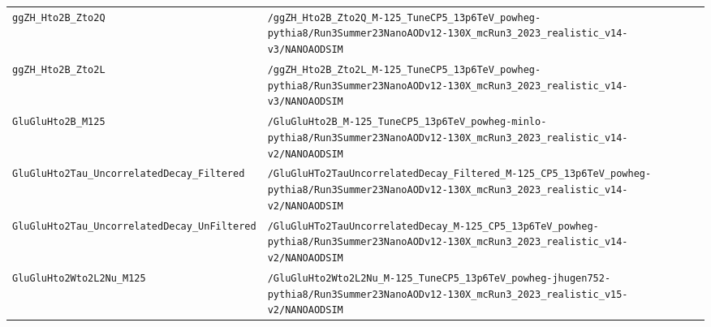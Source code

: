 \begin{longtable}{@{}>{\RaggedRight\arraybackslash}p{} >{\RaggedRight\arraybackslash}p{}@{}}
\texttt{ggZH\_\allowbreak{}Hto2B\_\allowbreak{}Zto2Q} & \texttt{/\allowbreak{}ggZH\_\allowbreak{}Hto2B\_\allowbreak{}Zto2Q\_\allowbreak{}M-\allowbreak{}125\_\allowbreak{}TuneCP5\_\allowbreak{}13p6TeV\_\allowbreak{}powheg-\allowbreak{}pythia8/\allowbreak{}Run3Summer23NanoAODv12-\allowbreak{}130X\_\allowbreak{}mcRun3\_\allowbreak{}2023\_\allowbreak{}realistic\_\allowbreak{}v14-\allowbreak{}v3/\allowbreak{}NANOAODSIM} \\
\addlinespace[2pt]
\texttt{ggZH\_\allowbreak{}Hto2B\_\allowbreak{}Zto2L} & \texttt{/\allowbreak{}ggZH\_\allowbreak{}Hto2B\_\allowbreak{}Zto2L\_\allowbreak{}M-\allowbreak{}125\_\allowbreak{}TuneCP5\_\allowbreak{}13p6TeV\_\allowbreak{}powheg-\allowbreak{}pythia8/\allowbreak{}Run3Summer23NanoAODv12-\allowbreak{}130X\_\allowbreak{}mcRun3\_\allowbreak{}2023\_\allowbreak{}realistic\_\allowbreak{}v14-\allowbreak{}v3/\allowbreak{}NANOAODSIM} \\
\addlinespace[2pt]
\texttt{GluGluHto2B\_\allowbreak{}M125} & \texttt{/\allowbreak{}GluGluHto2B\_\allowbreak{}M-\allowbreak{}125\_\allowbreak{}TuneCP5\_\allowbreak{}13p6TeV\_\allowbreak{}powheg-\allowbreak{}minlo-\allowbreak{}pythia8/\allowbreak{}Run3Summer23NanoAODv12-\allowbreak{}130X\_\allowbreak{}mcRun3\_\allowbreak{}2023\_\allowbreak{}realistic\_\allowbreak{}v14-\allowbreak{}v2/\allowbreak{}NANOAODSIM} \\
\addlinespace[2pt]
\texttt{GluGluHto2Tau\_\allowbreak{}UncorrelatedDecay\_\allowbreak{}Filtered} & \texttt{/\allowbreak{}GluGluHTo2TauUncorrelatedDecay\_\allowbreak{}Filtered\_\allowbreak{}M-\allowbreak{}125\_\allowbreak{}CP5\_\allowbreak{}13p6TeV\_\allowbreak{}powheg-\allowbreak{}pythia8/\allowbreak{}Run3Summer23NanoAODv12-\allowbreak{}130X\_\allowbreak{}mcRun3\_\allowbreak{}2023\_\allowbreak{}realistic\_\allowbreak{}v14-\allowbreak{}v2/\allowbreak{}NANOAODSIM} \\
\addlinespace[2pt]
\texttt{GluGluHto2Tau\_\allowbreak{}UncorrelatedDecay\_\allowbreak{}UnFiltered} & \texttt{/\allowbreak{}GluGluHTo2TauUncorrelatedDecay\_\allowbreak{}M-\allowbreak{}125\_\allowbreak{}CP5\_\allowbreak{}13p6TeV\_\allowbreak{}powheg-\allowbreak{}pythia8/\allowbreak{}Run3Summer23NanoAODv12-\allowbreak{}130X\_\allowbreak{}mcRun3\_\allowbreak{}2023\_\allowbreak{}realistic\_\allowbreak{}v14-\allowbreak{}v2/\allowbreak{}NANOAODSIM} \\
\addlinespace[2pt]
\texttt{GluGluHto2Wto2L2Nu\_\allowbreak{}M125} & \texttt{/\allowbreak{}GluGluHto2Wto2L2Nu\_\allowbreak{}M-\allowbreak{}125\_\allowbreak{}TuneCP5\_\allowbreak{}13p6TeV\_\allowbreak{}powheg-\allowbreak{}jhugen752-\allowbreak{}pythia8/\allowbreak{}Run3Summer23NanoAODv12-\allowbreak{}130X\_\allowbreak{}mcRun3\_\allowbreak{}2023\_\allowbreak{}realistic\_\allowbreak{}v15-\allowbreak{}v2/\allowbreak{}NANOAODSIM} \\

\end{longtable}
